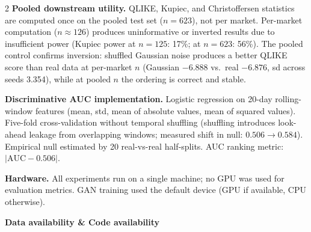 \documentclass[10pt]{article}
\begin{document}
\begin{multicols}{2}
\textbf{Pooled downstream utility.}
QLIKE, Kupiec, and Christoffersen statistics are computed once on the pooled test set ($n=623$), not per market. Per-market computation ($n\approx126$) produces uninformative or inverted results due to insufficient power (Kupiec power at $n=125$: 17\%; at $n=623$: 56\%). The pooled control confirms inversion: shuffled Gaussian noise produces a better QLIKE score than real data at per-market $n$ (Gaussian $-6.888$ vs.\ real $-6.876$, sd across seeds 3.354), while at pooled $n$ the ordering is correct and stable.

\textbf{Discriminative AUC implementation.}
Logistic regression on 20-day rolling-window features (mean, std, mean of absolute values, mean of squared values). Five-fold cross-validation without temporal shuffling (shuffling introduces look-ahead leakage from overlapping windows; measured shift in null: $0.506 \to 0.584$). Empirical null estimated by 20 real-vs-real half-splits. AUC ranking metric: $|\text{AUC} - 0.506|$.

\textbf{Hardware.} All experiments run on a single machine; no GPU was used for evaluation metrics. GAN training used the default device (GPU if available, CPU otherwise).

\end{multicols}

\clearpage

\begin{tcolorbox}[
  colback=NavyBg, colframe=NavyBg!60!black, arc=4pt,
  left=8pt, right=8pt, top=4pt, bottom=4pt,
  before skip=0pt, after skip=10pt]
{\large\bfseries\color{Navy} Data availability \& Code availability}
\end{tcolorbox}
\end{document}
